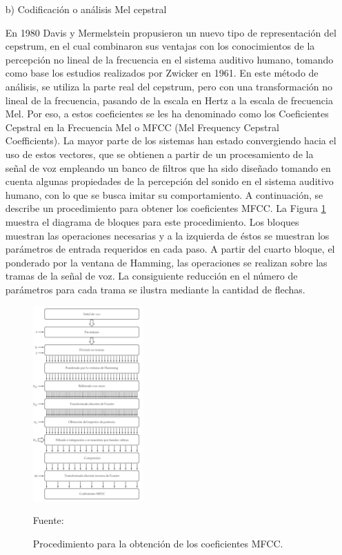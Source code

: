 \begin{enumerate}
\newpage
\item[b)]Codificación o análisis Mel cepstral
\par
En 1980 Davis y Mermelstein propusieron un nuevo tipo de representación del cepstrum, en el cual combinaron sus ventajas con los conocimientos de la percepción no lineal de la frecuencia en el sistema auditivo humano, tomando como base los estudios realizados por Zwicker en 1961. En este método de análisis, se utiliza la parte real del cepstrum, pero con una transformación no lineal de la frecuencia, pasando de la escala en Hertz a la escala de frecuencia Mel. Por eso, a estos coeficientes se les ha denominado como los Coeficientes Cepstral en la Frecuencia Mel o MFCC (Mel Frequency Cepstral Coefficients).
\vskip 0.5cm
La mayor parte de los sistemas han estado convergiendo hacia el uso de estos vectores, que se obtienen a partir de un procesamiento de la señal de voz empleando un banco de filtros que ha sido diseñado tomando en cuenta algunas propiedades de la percepción del sonido en el sistema auditivo humano, con lo que se busca imitar su comportamiento.
\vskip 0.5cm
A continuación, se describe un procedimiento para obtener los coeficientes MFCC. La Figura \ref{fig:figura2.38} muestra el diagrama de bloques para este procedimiento. Los bloques muestran las operaciones necesarias y a la izquierda de éstos se muestran los parámetros de entrada requeridos en cada paso. A partir del cuarto bloque, el ponderado por la ventana de Hamming, las operaciones se realizan sobre las tramas de la señal de voz. La consiguiente reducción en el número de parámetros para cada trama se ilustra mediante la cantidad de flechas.

\newpage
\begin{figure}[ht]
\begin{center}
\includegraphics[width=0.4\textwidth]{Imagenes/Cap2/image039}
\end{center}
\begin{center}
\vskip -0.5cm
\caption{\small{Procedimiento para la obtención de los coeficientes MFCC.}}
\label{fig:figura2.38}
{\small{Fuente: \cite{unam}}}
\end{center}
\end{figure}


\end{enumerate}
